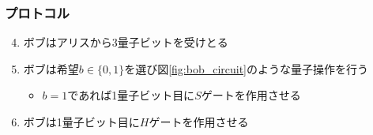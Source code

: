\begin{frame}
  \frametitle{プロトコル}

  \begin{enumerate}
    \setcounter{enumi}{3}

    \item<+-> ボブはアリスから3量子ビットを受けとる
    
    \item<+-> ボブは希望$b \in \{0, 1\}$を選び図\ref{fig:bob_circuit}のような量子操作を行う
    \begin{itemize}
      \item $b = 1$であれば1量子ビット目に$S$ゲートを作用させる
    \end{itemize}
    \label{enum:bob_s_gate}

    \item ボブは1量子ビット目に$H$ゲートを作用させる
    \label{enum:bob_h_gate}
  \end{enumerate}

\end{frame}

